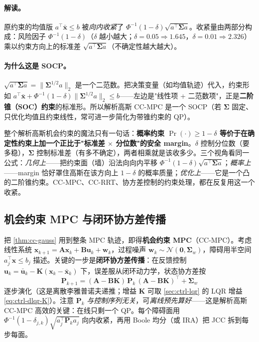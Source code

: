 \paragraph{解读。}
原约束的均值版 $a^\top\bar{\mathbf{x}}\le b$ 被\emph{向内收紧}了 $\Phi^{-1}(1-\delta)\sqrt{a^\top\boldsymbol{\Sigma}a}$。收紧量由两部分构成：风险因子 $\Phi^{-1}(1-\delta)$（$\delta$ 越小越大；$\delta=0.05\Rightarrow1.645$，$\delta=0.01\Rightarrow2.326$）乘以约束方向上的标准差 $\sqrt{a^\top\boldsymbol{\Sigma}a}$（不确定性越大越大）。

\paragraph{为什么这是 SOCP。}
$\sqrt{a^\top\boldsymbol{\Sigma}a}=\|\boldsymbol{\Sigma}^{1/2}a\|_2$ 是一个二范数。把决策变量（如均值轨迹）代入，约束形如 $a^\top\bar{\mathbf{x}}+\Phi^{-1}(1-\delta)\|\boldsymbol{\Sigma}^{1/2}a\|_2\le b$——左边是"线性项 + 二范数项"，正是\textbf{二阶锥（SOC）约束}的标准形。所以解析高斯 CC-MPC 是一个 SOCP（若 $\boldsymbol{\Sigma}$ 固定、只优化均值且约束线性，常可进一步简化为带锥约束的 QP）。

\begin{insight}
整个解析高斯机会约束的魔法只有一句话：\textbf{概率约束 $\Pr(\cdot)\ge1-\delta$ 等价于在确定性约束上加一个正比于"标准差 $\times$ 分位数"的安全 margin}。$\delta$ 控制分位数（要多稳），$\boldsymbol{\Sigma}$ 控制标准差（有多不确定），两者相乘就是该收多少。三个视角看同一公式：\emph{几何上}——把约束面（墙）沿法向向内平移 $\Phi^{-1}(1-\delta)\sqrt{a^\top\boldsymbol{\Sigma}a}$；\emph{概率上}——margin 恰好罩住高斯在该方向上 $1-\delta$ 的概率质量；\emph{优化上}——它是一个凸的二阶锥约束。CC-MPC、CC-RRT、协方差控制的约束处理，都在反复用这一个收紧。
\end{insight}

\subsection{机会约束 MPC 与闭环协方差传播}
\label{sec:cc-mpc}

把 \cref{thm:cc-gauss} 用到整条 MPC 轨迹，即得\textbf{机会约束 MPC}（CC-MPC）。考虑线性系统 $\mathbf{x}_{k+1}=\mathbf{A}\mathbf{x}_k+\mathbf{B}\mathbf{u}_k+\mathbf{w}_k$，过程噪声 $\mathbf{w}_k\sim\mathcal{N}(\mathbf{0},\boldsymbol{\Sigma}_w)$，障碍用半空间 $a_j^\top\mathbf{x}\le b_j$ 描述。关键的一步是\textbf{闭环协方差传播}：在反馈控制 $\mathbf{u}_k=\bar{\mathbf{u}}_k-\mathbf{K}(\mathbf{x}_k-\bar{\mathbf{x}}_k)$ 下，误差服从闭环动力学，状态协方差按
\begin{equation}
  \mathbf{P}_{k+1}=(\mathbf{A}-\mathbf{B}\mathbf{K})\,\mathbf{P}_k\,(\mathbf{A}-\mathbf{B}\mathbf{K})^\top+\boldsymbol{\Sigma}_w
  \label{eq:cc-cov-prop}
\end{equation}
逐步演化（这是离散李雅普诺夫递推；增益 $\mathbf{K}$ 可取 \cref{sec:ctrl-lqr} 的 LQR 增益 \cref{eq:ctrl-dlqr-K}）。注意 $\mathbf{P}_k$ \emph{与控制序列无关}，可\emph{离线预先算好}——这是解析高斯 CC-MPC 高效的关键：在线只剩一个 QP。每个障碍面用 $\Phi^{-1}(1-\delta_{j,k})\sqrt{a_j^\top\mathbf{P}_k a_j}$ 向内收紧，再用 Boole 均分（或 IRA）把 JCC 拆到每步每面。

